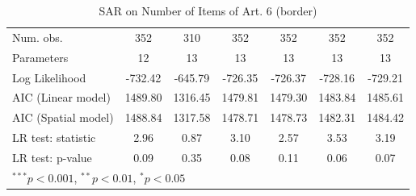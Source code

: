 \begin{table}[!h]
\begin{center}
\begin{tabular}{l c c c c c c }
\midrule
Num. obs.               & 352          & 310          & 352          & 352          & 352          & 352          \\
Parameters              & 12           & 13           & 13           & 13           & 13           & 13           \\
Log Likelihood          & -732.42      & -645.79      & -726.35      & -726.37      & -728.16      & -729.21      \\
AIC (Linear model)      & 1489.80      & 1316.45      & 1479.81      & 1479.30      & 1483.84      & 1485.61      \\
AIC (Spatial model)     & 1488.84      & 1317.58      & 1478.71      & 1478.73      & 1482.31      & 1484.42      \\
LR test: statistic      & 2.96         & 0.87         & 3.10         & 2.57         & 3.53         & 3.19         \\
LR test: p-value        & 0.09         & 0.35         & 0.08         & 0.11         & 0.06         & 0.07         \\
\bottomrule
\multicolumn{7}{l}{\scriptsize{$^{***}p<0.001$, $^{**}p<0.01$, $^*p<0.05$}}
\end{tabular}
\caption{SAR on Number of Items of Art. 6 (border)}
\label{table:coefficients}
\end{center}
\end{table}
